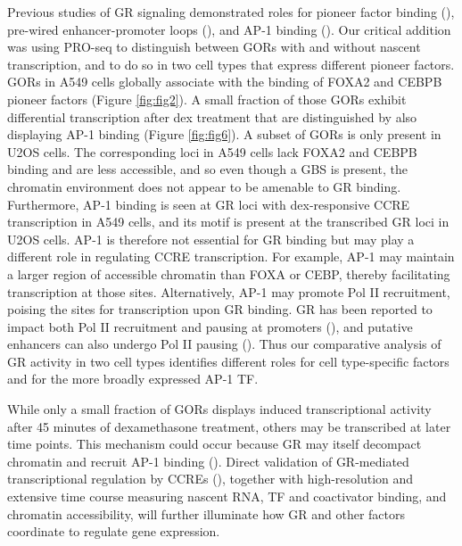 \documentclass{article}
\begin{document}
{Previous studies of GR signaling demonstrated roles for pioneer factor binding (\cite{so_determinants_2007, belikov_foxa1_2009, grontved_cebp_2013, mcdowell_glucocorticoid_2018}), pre-wired enhancer-promoter loops (\cite{dippolito_pre-established_2018}), and AP-1 binding (\cite{so_determinants_2007, biddie_transcription_2011, vockley_direct_2016, mcdowell_glucocorticoid_2018}). Our critical addition was using PRO-seq to distinguish between GORs with and without nascent transcription, and to do so in two cell types that express different pioneer factors. GORs in A549 cells globally associate with the binding of FOXA2 and CEBPB pioneer factors (Figure \ref{fig:fig2}). A small fraction of those GORs exhibit differential transcription after dex treatment that are distinguished by also displaying AP-1 binding (Figure \ref{fig:fig6}). A subset of GORs is only present in U2OS cells. The corresponding loci in A549 cells lack FOXA2 and CEBPB binding and are less accessible, and so even though a GBS is present, the chromatin environment does not appear to be amenable to GR binding. Furthermore, AP-1 binding is seen at GR loci with dex-responsive CCRE transcription in A549 cells, and its motif is present at the transcribed GR loci in U2OS cells. AP-1 is therefore not essential for GR binding but may play a different role in regulating CCRE transcription. For example, AP-1 may maintain a larger region of accessible chromatin than FOXA or CEBP, thereby facilitating transcription at those sites. Alternatively, AP-1 may promote Pol II recruitment, poising the sites for transcription upon GR binding. GR has been reported to impact both Pol II recruitment and pausing at promoters (\cite{gupte_glucocorticoid_2013, sacta_gene-specific_2018}), and putative enhancers can also undergo Pol II pausing (\cite{core_analysis_2014, scruggs_bidirectional_2015, henriques_widespread_2018}). Thus our comparative analysis of GR activity in two cell types identifies different roles for cell type-specific factors and for the more broadly expressed AP-1 TF.

While only a small fraction of GORs displays induced transcriptional activity after 45 minutes of dexamethasone treatment, others may be transcribed at later time points. This mechanism could occur because GR may itself decompact chromatin and recruit AP-1 binding (\cite{vockley_direct_2016, jubb_glucocorticoid_2017}). Direct validation of GR-mediated transcriptional regulation by CCREs (\cite{ehmsen_definition_2019}), together with high-resolution and extensive time course measuring nascent RNA, TF and coactivator binding, and chromatin accessibility, will further illuminate how GR and other factors coordinate to regulate gene expression.

}
\end{document}

